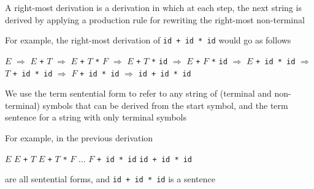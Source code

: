 \documentclass[8pt,a4paper,compress]{beamer}
\newcommand{\mm}[1]{$#1$}
\newenvironment{spaced}
{
\smallskip
\hspace{.5cm}
\begin{minipage}[c]{\textwidth}
}
{
\end{minipage}
\smallskip
}
\begin{document}
\begin{frame}[fragile]
\pause

A right-most derivation is a derivation in which at each step, the next string is derived by applying a production rule for rewriting the right-most non-terminal

\pause
\bigskip

For example, the right-most derivation of \lstinline{id + id * id} would go as follows

\text{ }
\begin{spaced}
\begin{production}
\underline{\mm{E}} \mm{\Rightarrow} \mm{E} \lstinline{+} \underline{\mm{T}}
   \mm{\Rightarrow} \mm{E} \lstinline{+} \mm{T} \lstinline{*} \underline{\mm{F}}
   \mm{\Rightarrow} \mm{E} \lstinline{+} \underline{\mm{T}} \lstinline{*} \lstinline{id}
   \mm{\Rightarrow} \mm{E} \lstinline{+} \underline{\mm{F}} \lstinline{*} \lstinline{id}
   \mm{\Rightarrow} \underline{\mm{E}} \lstinline{+ id * id}
   \mm{\Rightarrow} \underline{\mm{T}} \lstinline{+ id * id}
   \mm{\Rightarrow} \underline{\mm{F}} \lstinline{+ id * id}
   \mm{\Rightarrow} \lstinline{id + id * id}
\end{production}
\end{spaced}

\pause

We use the term sentential form to refer to any string of (terminal and non-terminal) symbols that can be derived from the start symbol, and the term sentence for a string with only terminal symbols

\pause
\bigskip

For example, in the previous derivation

\text{ }
\begin{spaced}
\begin{production}
\mm{E}
\mm{E} \lstinline{+} \mm{T}
\mm{E} \lstinline{+} \mm{T} \lstinline{*} \mm{F}
...
\mm{F} \lstinline{+ id * id}
\lstinline{id + id * id}
\end{production}
\end{spaced}

are all sentential forms, and \lstinline{id + id * id} is a sentence
\end{frame}
\end{document}
